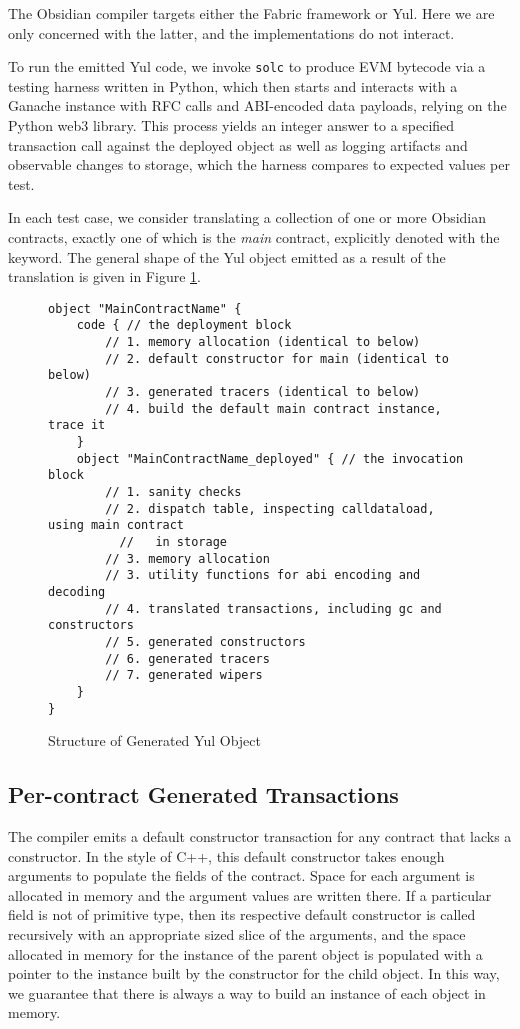 The Obsidian compiler targets either the Fabric framework or Yul. Here we
are only concerned with the latter, and the implementations do not
interact.

To run the emitted Yul code, we invoke \texttt{solc} to produce EVM
bytecode via a testing harness written in Python, which then starts and
interacts with a Ganache instance with RFC calls and ABI-encoded data
payloads, relying on the Python web3 library. This process yields an
integer answer to a specified transaction call against the deployed object
as well as logging artifacts and observable changes to storage, which the
harness compares to expected values per test.

In each test case, we consider translating a collection of one or more
Obsidian contracts, exactly one of which is the \emph{main} contract,
explicitly denoted with the  keyword. The general shape of the
Yul object emitted as a result of the translation is given in
Figure \ref{code.1}.

\begin{figure}[hbtp]
    \caption{Structure of Generated Yul Object}
    \label{code.1}
    \begin{lstlisting}[language=yul,frame=single]
object "MainContractName" {
    code { // the deployment block
        // 1. memory allocation (identical to below)
        // 2. default constructor for main (identical to below)
        // 3. generated tracers (identical to below)
        // 4. build the default main contract instance, trace it
    }
    object "MainContractName_deployed" { // the invocation block
        // 1. sanity checks
        // 2. dispatch table, inspecting calldataload, using main contract
          //   in storage
        // 3. memory allocation
        // 3. utility functions for abi encoding and decoding
        // 4. translated transactions, including gc and constructors
        // 5. generated constructors
        // 6. generated tracers
        // 7. generated wipers
    }
}
    \end{lstlisting}
\end{figure}

\subsection{Per-contract Generated Transactions}

The compiler emits a default constructor transaction for any contract that
lacks a constructor. In the style of C++, this default constructor takes
enough arguments to populate the fields of the contract. \cite{TODO} Space
for each argument is allocated in memory and the argument values are
written there. If a particular field is not of primitive type, then its
respective default constructor is called recursively with an appropriate
sized slice of the arguments, and the space allocated in memory for the
instance of the parent object is populated with a pointer to the instance
built by the constructor for the child object. In this way, we guarantee
that there is always a way to build an instance of each object in memory.

